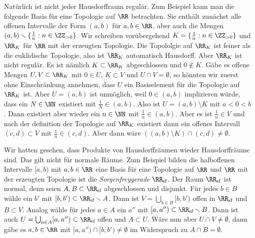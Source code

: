 Natürlich ist nicht jeder Hausdorffraum regulär. Zum Beispiel kann man die folgende Basis für eine Topologie auf $\RR$ betrachten. Sie enthält zunächst alle offenen Intervalle der Form $(a,b)$ für $a,b\in\RR$, aber auch die Mengen $(a,b)\setminus\{\tfrac1n : n\in\ZZ_{>0}\}$. Wir schreiben vorübergehend $K = \{\tfrac1n : n\in\ZZ_{>0}\}$ und $\RR_K$ für $\RR$ mit der erzeugten Topologie. Die Topololgie auf $\RR_K$ ist feiner als die euklidische Topologie, also ist $\RR_K$ automatisch Hausdorff. Aber $\RR_K$ ist nicht regulär. Es ist nämlich $K\subset \RR_K$ abgeschlossen und $0\not\in K$. Gäbe es offene Mengen $U,V\subset\RR_K$ mit $0\in U$, $K\subset V$ und $U\cap V = \emptyset$, so könnten wir zuerst ohne Einschränkung annehmen, dass $U$ ein Basiselement für die Topologie auf $\RR_K$ ist. Aber $U=(a,b)$ ist unmöglich, weil $0\in(a,b)$ implizieren würde, dass ein $N\in\NN$ existiert mit $\tfrac1N\in (a,b)$. Also ist $U = (a,b)\setminus K$ mit $a<0<b$. Dann existiert aber wieder ein $n\in\NN$ mit $\tfrac1n\in(a,b)$. Aber es ist $\frac1n\in V$ und nach der definition der Topologie auf $\RR_K$ existiert dann ein offenes Intervall $(c,d)\subset V$ mit $\tfrac1n\in(c,d)$. Aber dann wäre $((a,b)\setminus K)\cap (c,d)\neq\emptyset$.

Wir hatten gesehen, dass Produkte von Hausdorffräumen wieder Hausdorffräume sind. Das gilt nicht für normale Räume. Zum Beispiel bilden die halboffenen Intervalle $[a,b)$ mit $a,b\in\RR$ eine Basis für eine Topologie auf $\RR$ und $\RR$ mit der erzeugten Topologie ist die \emph{Sorgenfreygerade} $\Rsf$. Der Raum $\Rsf$ ist normal, denn seien $A,B\subset\Rsf$ abgeschlossen und disjunkt. Für jedes $b\in B$ wähle ein $b'$ mit $[b,b')\subset \Rsf\setminus A$. Dann ist $V = \bigcup_{b\in B}[b,b')$ offen in $\Rsf$ und $B\subset V$. Analog wähle für jedes $a\in A$ ein $a''$ mit $[a,a'')\subset \Rsf\setminus B$. Dann ist auch $U = \bigcup_{a\in A} [a,a'')\subset\Rsf$ offen und $A\subset U$. Wäre nun aber $U\cap V\neq\emptyset$, dann gäbe es $a,b\in\RR$ mit $[a,a'')\cap [b,b')\neq\emptyset$ im Widerspruch zu $A\cap B = \emptyset$.

